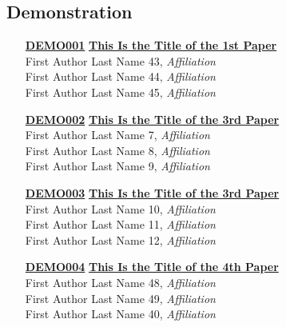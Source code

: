 \subsection{Demonstration}
\begin{enumerate}
\item[\href{https://doi.org/10.1145/1122445.1122456}{\textbf{DEMO001}}]
\href{https://doi.org/10.1145/1122445.1122456}{\textbf{This Is the Title of the 1st Paper}}\\
First Author Last Name 43, \emph{Affiliation}\\
First Author Last Name 44, \emph{Affiliation}\\
First Author Last Name 45, \emph{Affiliation}\\

\item[\href{https://doi.org/10.1145/1122445.1122456}{\textbf{DEMO002}}]
\href{https://doi.org/10.1145/1122445.1122456}{\textbf{This Is the Title of the 3rd Paper}}\\
First Author Last Name 7, \emph{Affiliation}\\
First Author Last Name 8, \emph{Affiliation}\\
First Author Last Name 9, \emph{Affiliation}\\

\item[\href{https://doi.org/10.1145/1122445.1122456}{\textbf{DEMO003}}]
\href{https://doi.org/10.1145/1122445.1122456}{\textbf{This Is the Title of the 3rd Paper}}\\
First Author Last Name 10, \emph{Affiliation}\\
First Author Last Name 11, \emph{Affiliation}\\
First Author Last Name 12, \emph{Affiliation}\\

\item[\href{https://doi.org/10.1145/1122445.1122456}{\textbf{DEMO004}}]
\href{https://doi.org/10.1145/1122445.1122456}{\textbf{This Is the Title of the 4th Paper}}\\
First Author Last Name 48, \emph{Affiliation}\\
First Author Last Name 49, \emph{Affiliation}\\
First Author Last Name 40, \emph{Affiliation}\\
\end{enumerate}


